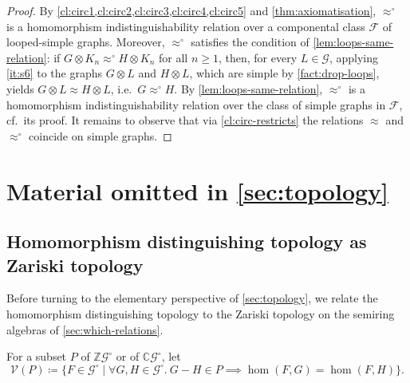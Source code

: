 \documentclass[11pt]{scrartcl}
\theoremstyle{definition}
\theoremstyle{plain}
\theoremstyle{remark}
\newcommand{\lG}{\mathcal{G}^\circ}
\newcommand{\G}{\mathcal{G}}
\begin{document}
\begin{proof}
		By \cref{cl:circ1,cl:circ2,cl:circ3,cl:circ4,cl:circ5} and \cref{thm:axiomatisation},
		$\approx^\circ$ is a homomorphism indistinguishability relation over a componental class $\mathcal{F}$ of looped-simple graphs.
		Moreover, $\approx^\circ$ satisfies the condition of \cref{lem:loops-same-relation}:
		if $G \otimes K_n \approx^\circ H \otimes K_n$ for all $n \geq 1$,
		then, for every $L \in \G$, applying \cref{it:s6} to the graphs $G \otimes L$ and $H \otimes L$, which are simple by \cref{fact:drop-loops},
		yields $G \otimes L \approx H \otimes L$, i.e.\ $G \approx^\circ H$.
		By \cref{lem:loops-same-relation},
		$\approx^\circ$ is a homomorphism indistinguishability relation over the class of simple graphs in $\mathcal{F}$, cf.\ its proof.
		It remains to observe that via \cref{cl:circ-restricts} the relations $\approx$ and $\approx^\circ$ coincide on simple graphs.
	\end{proof}



    \section{Material omitted in \texorpdfstring{\cref{sec:topology}}{Topology}}

    \subsection{Homomorphism distinguishing topology as Zariski topology}

    Before turning to the elementary perspective of \cref{sec:topology},
    we relate the homomorphism distinguishing topology to the Zariski topology on the semiring algebras of \cref{sec:which-relations}.

    For a subset $P$ of $\mathbb{Z}\lG$ or of $\mathbb{C}\lG$, let
    \[
        \mathcal{V}(P) \coloneqq \{F \in \lG \mid \forall G, H \in \lG.\ G - H \in P \implies \hom(F,G) = \hom(F,H)\}.
    \]
    
\end{document}
